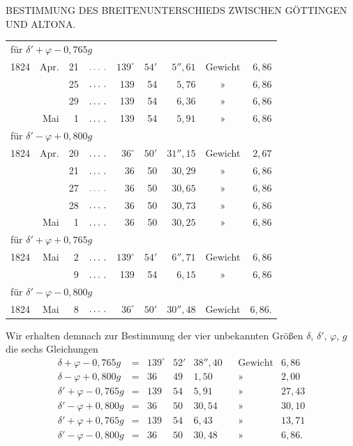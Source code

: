 \clearpage
\noindent{}\parbox[t]{\dimexpr\textwidth-10mm\relax}{\centering\scriptsize BESTIMMUNG DES BREITENUNTERSCHIEDS ZWISCHEN GÖTTINGEN UND ALTONA.}\par
\begin{center}
\begin{tabular}{rrrc rr r c r}
\multicolumn{9}{l}{für $\delta'+\varphi-0{,}765g$}\\
1824&Apr.&21&$\ldots\,\ldotp$&$139^\circ$&$54'$&$5''{,}61$&Gewicht&$6{,}86$\\
&&25&$\ldots\,\ldotp$&139&54&$5{,}76$&»&$6{,}86$\\
&&29&$\ldots\,\ldotp$&139&54&$6{,}36$&»&$6{,}86$\\
&Mai&1&$\ldots\,\ldotp$&139&54&$5{,}91$&»&$6{,}86$\\
\multicolumn{9}{l}{für $\delta'-\varphi+0{,}800g$}\\
1824&Apr.&20&$\ldots\,\ldotp$&$36^\circ$&$50'$&$31''{,}15$&Gewicht&$2{,}67$\\
&&21&$\ldots\,\ldotp$&36&50&$30{,}29$&»&$6{,}86$\\
&&27&$\ldots\,\ldotp$&36&50&$30{,}65$&»&$6{,}86$\\
&&28&$\ldots\,\ldotp$&36&50&$30{,}73$&»&$6{,}86$\\
&Mai&1&$\ldots\,\ldotp$&36&50&$30{,}25$&»&$6{,}86$\\
\multicolumn{9}{l}{für $\delta'+\varphi+0{,}765g$}\\
1824&Mai&2&$\ldots\,\ldotp$&$139^\circ$&$54'$&$6''{,}71$&Gewicht&$6{,}86$\\
&&9&$\ldots\,\ldotp$&139&54&$6{,}15$&»&$6{,}86$\\
\multicolumn{9}{l}{für $\delta'-\varphi-0{,}800g$}\\
1824&Mai&8&$\ldots\,\ldotp$&$36^\circ$&$50'$&$30''{,}48$&Gewicht&$6{,}86$.
\end{tabular}
\end{center}
Wir erhalten demnach zur Bestimmung der vier unbekannten Größen $\delta$, $\delta'$, $\varphi$, $g$ die sechs Gleichungen
\[
\begin{array}{rclrrrcr}
\delta+\varphi-0{,}765g&=&139^\circ&52'&38''{,}40&&\text{Gewicht}&6{,}86\\
\delta-\varphi+0{,}800g&=&36&49&1{,}50&&\text{»}&2{,}00\\
\delta'+\varphi-0{,}765g&=&139&54&5{,}91&&\text{»}&27{,}43\\
\delta'-\varphi+0{,}800g&=&36&50&30{,}54&&\text{»}&30{,}10\\
\delta'+\varphi+0{,}765g&=&139&54&6{,}43&&\text{»}&13{,}71\\
\delta'-\varphi-0{,}800g&=&36&50&30{,}48&&\text{»}&6{,}86.
\end{array}
\]
